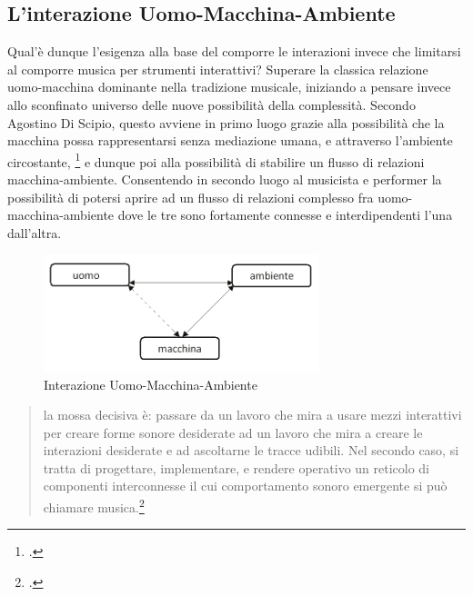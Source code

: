 \subsection{L'interazione Uomo-Macchina-Ambiente}
\label{sec:L'interazione Uomo-Macchina-Ambiente}

Qual'è dunque l'esigenza alla base del comporre le interazioni invece 
che limitarsi al comporre musica per strumenti interattivi? 
Superare la classica relazione uomo-macchina dominante nella tradizione musicale, 
iniziando a pensare invece allo sconfinato universo delle nuove possibilità della complessità.
Secondo Agostino Di Scipio, questo avviene in primo luogo grazie 
alla possibilità che la macchina possa rappresentarsi
senza mediazione umana, e attraverso l'ambiente circostante, \footcite{discipio_polverisonore_2016}
e dunque poi alla possibilità di stabilire un flusso di relazioni macchina-ambiente. 
Consentendo in secondo luogo al musicista e performer 
la possibilità di potersi aprire ad un flusso di relazioni 
complesso fra uomo-macchina-ambiente dove le tre sono fortamente connesse e interdipendenti 
l'una dall'altra.

\begin{figure}[h!]
\begin{center}
\vspace{0.5cm}
\includegraphics[width=8cm]{figures/uomo_macchina_ambiente.png} 
    \caption{Interazione Uomo-Macchina-Ambiente}
    \vspace{0.5cm}
\end{center}
\end{figure} 

\begin{quote}
la mossa decisiva è: passare da un lavoro che mira a usare mezzi interattivi per creare forme sonore desiderate ad
un lavoro che mira a creare le interazioni desiderate e ad ascoltarne le tracce udibili. Nel secondo caso, si tratta
di progettare, implementare, e rendere operativo un reticolo di componenti interconnesse il cui comportamento
sonoro emergente si può chiamare musica.\footcite{discipio_polverisonore_2016}
\end{quote}

